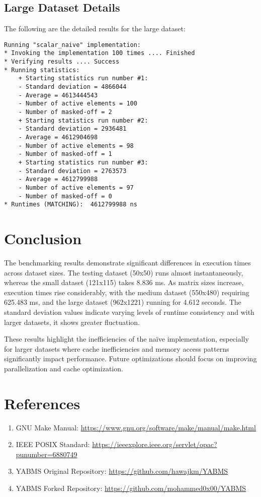 \documentclass[12pt]{article}
\begin{document}
\subsection{Large Dataset Details}
The following are the detailed results for the large dataset:
\begin{lstlisting}[caption=Large Dataset Execution Details, style=customc]
Running "scalar_naive" implementation:
* Invoking the implementation 100 times .... Finished
* Verifying results .... Success
* Running statistics:
    + Starting statistics run number #1:
    - Standard deviation = 4866044
    - Average = 4613444543
    - Number of active elements = 100
    - Number of masked-off = 2
    + Starting statistics run number #2:
    - Standard deviation = 2936481
    - Average = 4612904698
    - Number of active elements = 98
    - Number of masked-off = 1
    + Starting statistics run number #3:
    - Standard deviation = 2763573
    - Average = 4612799988
    - Number of active elements = 97
    - Number of masked-off = 0
* Runtimes (MATCHING):  4612799988 ns
\end{lstlisting}


\section{Conclusion}
The benchmarking results demonstrate significant differences in execution times across dataset sizes. The testing dataset (50x50) runs almost instantaneously, whereas the small dataset (121x115) takes 8.836 ms. As matrix sizes increase, execution times rise considerably, with the medium dataset (550x480) requiring 625.483 ms, and the large dataset (962x1221) running for 4.612 seconds. The standard deviation values indicate varying levels of runtime consistency and with larger datasets, it shows greater fluctuation.

These results highlight the inefficiencies of the naïve implementation, especially for larger datasets where cache inefficiencies and memory access patterns significantly impact performance. Future optimizations should focus on improving parallelization and cache optimization.

\section{References}
\begin{enumerate}
    \item GNU Make Manual: \url{https://www.gnu.org/software/make/manual/make.html}
    \item IEEE POSIX Standard: \url{https://ieeexplore.ieee.org/servlet/opac?punumber=6880749}
    \item YABMS Original Repository: \url{https://github.com/hawajkm/YABMS}
    \item YABMS Forked Repository: \url{https://github.com/mohammed0x00/YABMS}
\end{enumerate}
\end{document}
